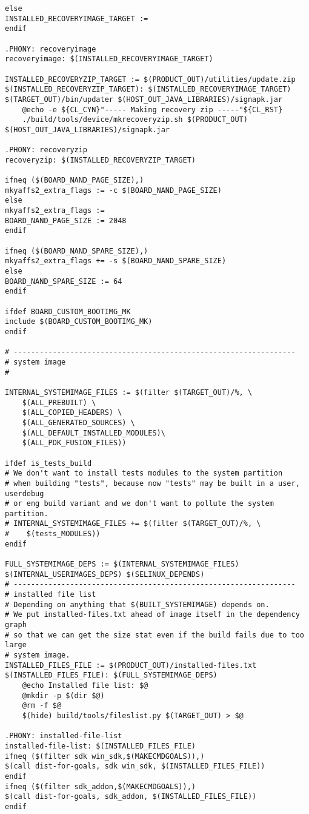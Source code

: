 \documentclass[12pt,a4paper]{article}
\begin{document}
\begin{verbatim}
else
INSTALLED_RECOVERYIMAGE_TARGET :=
endif

.PHONY: recoveryimage
recoveryimage: $(INSTALLED_RECOVERYIMAGE_TARGET)

INSTALLED_RECOVERYZIP_TARGET := $(PRODUCT_OUT)/utilities/update.zip
$(INSTALLED_RECOVERYZIP_TARGET): $(INSTALLED_RECOVERYIMAGE_TARGET) $(TARGET_OUT)/bin/updater $(HOST_OUT_JAVA_LIBRARIES)/signapk.jar
	@echo -e ${CL_CYN}"----- Making recovery zip -----"${CL_RST}
	./build/tools/device/mkrecoveryzip.sh $(PRODUCT_OUT) $(HOST_OUT_JAVA_LIBRARIES)/signapk.jar

.PHONY: recoveryzip
recoveryzip: $(INSTALLED_RECOVERYZIP_TARGET)

ifneq ($(BOARD_NAND_PAGE_SIZE),)
mkyaffs2_extra_flags := -c $(BOARD_NAND_PAGE_SIZE)
else
mkyaffs2_extra_flags :=
BOARD_NAND_PAGE_SIZE := 2048
endif

ifneq ($(BOARD_NAND_SPARE_SIZE),)
mkyaffs2_extra_flags += -s $(BOARD_NAND_SPARE_SIZE)
else
BOARD_NAND_SPARE_SIZE := 64
endif

ifdef BOARD_CUSTOM_BOOTIMG_MK
include $(BOARD_CUSTOM_BOOTIMG_MK)
endif

# -----------------------------------------------------------------
# system image
#

INTERNAL_SYSTEMIMAGE_FILES := $(filter $(TARGET_OUT)/%, \
    $(ALL_PREBUILT) \
    $(ALL_COPIED_HEADERS) \
    $(ALL_GENERATED_SOURCES) \
    $(ALL_DEFAULT_INSTALLED_MODULES)\
    $(ALL_PDK_FUSION_FILES))

ifdef is_tests_build
# We don't want to install tests modules to the system partition
# when building "tests", because now "tests" may be built in a user, userdebug
# or eng build variant and we don't want to pollute the system partition.
# INTERNAL_SYSTEMIMAGE_FILES += $(filter $(TARGET_OUT)/%, \
#    $(tests_MODULES))
endif

FULL_SYSTEMIMAGE_DEPS := $(INTERNAL_SYSTEMIMAGE_FILES) $(INTERNAL_USERIMAGES_DEPS) $(SELINUX_DEPENDS)
# -----------------------------------------------------------------
# installed file list
# Depending on anything that $(BUILT_SYSTEMIMAGE) depends on.
# We put installed-files.txt ahead of image itself in the dependency graph
# so that we can get the size stat even if the build fails due to too large
# system image.
INSTALLED_FILES_FILE := $(PRODUCT_OUT)/installed-files.txt
$(INSTALLED_FILES_FILE): $(FULL_SYSTEMIMAGE_DEPS)
	@echo Installed file list: $@
	@mkdir -p $(dir $@)
	@rm -f $@
	$(hide) build/tools/fileslist.py $(TARGET_OUT) > $@

.PHONY: installed-file-list
installed-file-list: $(INSTALLED_FILES_FILE)
ifneq ($(filter sdk win_sdk,$(MAKECMDGOALS)),)
$(call dist-for-goals, sdk win_sdk, $(INSTALLED_FILES_FILE))
endif
ifneq ($(filter sdk_addon,$(MAKECMDGOALS)),)
$(call dist-for-goals, sdk_addon, $(INSTALLED_FILES_FILE))
endif


\end{verbatim}
\end{document}

